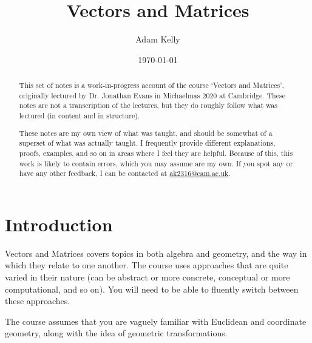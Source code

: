 \documentclass[a4]{scrreprt}
\title{Vectors and Matrices}
\author{Adam Kelly}
\date{\today}
\begin{document}
\maketitle

\begin{abstract}

	This set of notes is a work-in-progress account of the course `Vectors and Matrices', originally lectured by Dr. Jonathan Evans in Michaelmas 2020 at Cambridge. These notes are not a transcription of the lectures, but they do roughly follow what was lectured (in content and in structure).

	These notes are my own view of what was taught, and should be somewhat of a superset of what was actually taught. I frequently provide different explanations, proofs, examples, and so on in areas where I feel they are helpful. Because of this, this work is likely to contain errors, which you may assume are my own. If you spot any or have any other feedback, I can be contacted at \href{mailto:ak2316@cam.ac.uk}{ak2316@cam.ac.uk}.

\end{abstract}

\tableofcontents

\clearpage

\chapter{Introduction}

Vectors and Matrices covers topics in both algebra and geometry, and the way in which they relate to one another. The course uses approaches that are quite varied in their nature (can be abstract or more concrete, conceptual or more computational, and so on). You will need to be able to fluently switch between these approaches.

The course assumes that you are vaguely familiar with Euclidean and coordinate geometry, along with the idea of geometric transformations.
\end{document}
